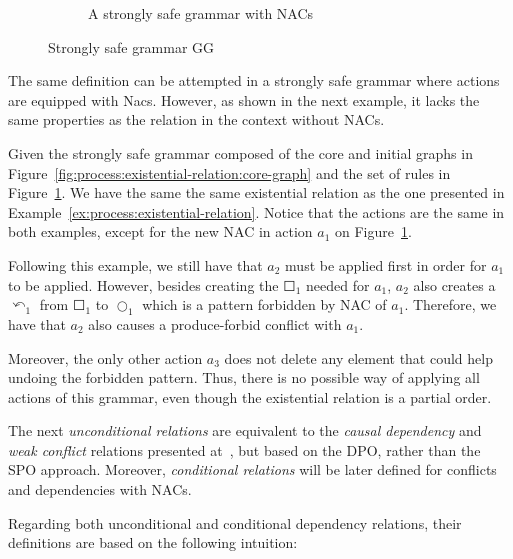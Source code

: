 \begin{example}
\begin{figure}[!ht]
\begin{subfigure}[t]{.5\textwidth}
    \caption{A strongly safe grammar with NACs}\label{fig:process:existential-relation:example-nacs}
  \end{subfigure}
  \caption{Strongly safe grammar GG}\label{fig:process:existential-relation}
\end{figure}
\end{example}

The same definition can be attempted in a strongly safe grammar where actions are equipped with Nacs. However, as shown in the next example, it lacks the same properties as the relation in the context without NACs.

\begin{example}\label{ex:process:existential-relation-fail}Given the strongly safe grammar composed of the core and initial graphs in Figure~\ref{fig:process:existential-relation:core-graph} and the set of rules in Figure~\ref{fig:process:existential-relation:example-nacs}. We have the same the same existential relation as the one presented in Example~\ref{ex:process:existential-relation}. Notice that the actions are the same in both examples, except
  for the new NAC in action $a_1$ on Figure~\ref{fig:process:existential-relation:example-nacs}.

  Following this example, we still have that $a_2$ must be applied first in order for $a_1$ to be applied. However, besides creating the $\Square_1$ needed for $a_1$, $a_2$ also creates a $\curvearrowleft_1$ from $\Square_1$ to $\Circle_1$ which is a pattern forbidden by NAC of $a_1$. Therefore, we have that $a_2$ also causes a produce-forbid conflict with $a_1$.

  Moreover, the only other action $a_3$ does not delete any element that could help undoing the forbidden pattern. Thus, there is no possible way of applying all actions of this grammar, even though the existential relation is a partial order.

\end{example}

The next \emph{unconditional relations} are equivalent to the \emph{causal dependency} and \emph{weak conflict} relations presented at~\cite{Ribeiro1996}, but based on the DPO, rather than the SPO approach. Moreover, \emph{conditional relations} will be later defined for conflicts and dependencies with NACs.

Regarding both unconditional and conditional dependency relations, their definitions are based on the following intuition:

